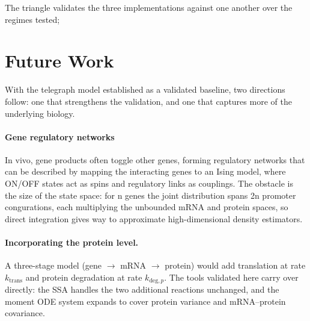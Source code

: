\documentclass[11pt]{article}
\begin{document}
The triangle validates the three implementations against one another over the regimes tested; 

\section{Future Work}
\label{sec:future}
With the telegraph model established as a validated baseline, two directions follow: one
that strengthens the validation, and one that captures more of the underlying biology.

\paragraph{Gene regulatory networks}
In vivo, gene products often toggle other genes, forming regulatory
networks that can be described by mapping the interacting genes to an Ising model, where ON/OFF
states act as spins and regulatory links as couplings. The obstacle is the size of the state space: for
n genes the joint distribution spans 2n promoter congurations, each multiplying the unbounded
mRNA and protein spaces, so direct integration gives way to approximate high-dimensional density
estimators.

\paragraph{Incorporating the protein level.}
A three-stage model (gene $\to$ mRNA $\to$ protein) would add translation at rate $k_{\mathrm{trans}}$ and protein degradation at rate $k_{\mathrm{deg},p}$.
The tools validated here carry over directly: the SSA handles the two additional reactions unchanged, and the moment ODE system expands to cover protein variance and mRNA--protein covariance.
\end{document}
